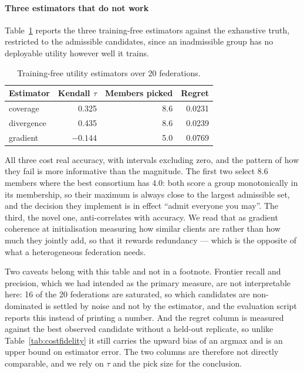 \documentclass[10pt,conference]{IEEEtran}
\begin{document}
\paragraph{Three estimators that do not work}

Table~\ref{tab:estimators} reports the three training-free estimators against
the exhaustive truth, restricted to the admissible candidates, since an
inadmissible group has no deployable utility however well it trains.

\begin{table}[t]
\caption{Training-free utility estimators over 20 federations.}
\label{tab:estimators}
\centering
\begin{tabular}{lrrr}
\toprule
Estimator & Kendall $\tau$ & Members picked & Regret \\
\midrule
coverage & 0.325 & 8.6 & 0.0231 \\
divergence & 0.435 & 8.6 & 0.0239 \\
gradient & $-0.144$ & 5.0 & 0.0769 \\
\bottomrule
\end{tabular}
\end{table}

All three cost real accuracy, with intervals excluding zero, and the pattern of
how they fail is more informative than the magnitude. The first two select 8.6
members where the best consortium has 4.0: both score a group monotonically in
its membership, so their maximum is always close to the largest admissible set,
and the decision they implement is in effect ``admit everyone you may''. The third, the novel one, anti-correlates with accuracy. We read that as
gradient coherence at initialisation measuring how similar clients are rather
than how much they jointly add, so that it rewards redundancy — which is the
opposite of what a heterogeneous federation needs.

Two caveats belong with this table and not in a footnote. Frontier recall
and precision, which we had intended as the primary measure, are not
interpretable here: 16 of the 20 federations are saturated, so which candidates
are non-dominated is settled by noise and not by the estimator, and the evaluation script reports this instead of printing a number. And the regret
column is measured against the best observed candidate without a held-out
replicate, so unlike Table~\ref{tab:costfidelity} it still carries the upward
bias of an argmax and is an upper bound on estimator error. The two columns are
therefore not directly comparable, and we rely on $\tau$ and the pick size for
the conclusion.
\end{document}
